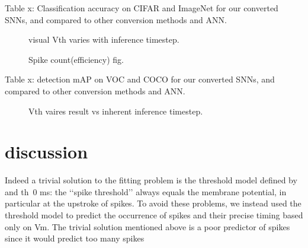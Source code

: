 \documentclass{article}
\begin{document}
Table x: Classification accuracy on CIFAR and ImageNet for our converted SNNs, and compared to other conversion methods and ANN.



\begin{figure}[h]
  \centering
  \fbox{\rule[-.5cm]{0cm}{4cm} \rule[-.5cm]{4cm}{0cm}}
  \caption{visual Vth varies with inference timestep.}
\end{figure}


\begin{figure}[h]
  \centering
  \fbox{\rule[-.5cm]{0cm}{4cm} \rule[-.5cm]{4cm}{0cm}}
  \caption{Spike count(efficiency) fig.}
\end{figure}


\begin{table}[htbp]


\end{table}

Table x: detection mAP on VOC and COCO for our converted SNNs, and compared to other conversion methods and ANN.


\begin{figure}[htbp]
  \centering
  \fbox{\rule[-.5cm]{0cm}{4cm} \rule[-.5cm]{4cm}{0cm}}
  \caption{Vth vaires result vs inherent inference timestep.}
\end{figure}

\section{discussion}

Indeed a trivial solution to
the fitting problem is the threshold model defined by  and th~0 ms: the ‘‘spike threshold’’ always equals
the membrane potential, in particular at the upstroke of spikes.
To avoid these problems, we instead used the threshold model
to predict the occurrence of spikes and their precise timing based
only on Vm. The trivial solution mentioned above is a poor
predictor of spikes since it would predict too many spikes
\end{document}

